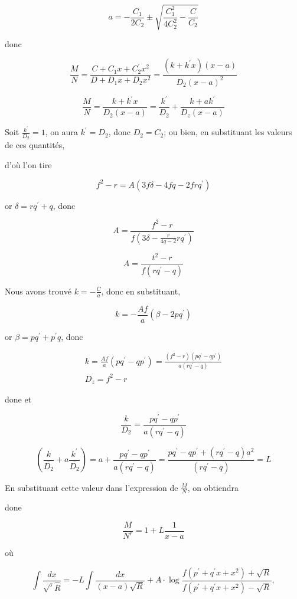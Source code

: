 \documentclass{article}
\begin{document}
\[
a=-\frac{C_{1}}{2 C_{2}} \pm \sqrt{\frac{C_{1}^{2}}{4 C_{2}^{2}}-\frac{C}{C_{2}}}
\]

donc

\[
\frac{M}{N}=\frac{C+C_{1} x+C_{2}^{\prime} x^{2}}{D+D_{1} x+D_{2} x^{2}}=\frac{\left(k+k^{\prime} x\right)(x-a)}{D_{2}(x-a)^{2}}
\]

\[
\frac{M}{N}=\frac{k+k^{\prime} x}{D_{2}(x-a)}=\frac{k^{\prime}}{D_{2}}+\frac{k+a k^{\prime}}{D_{z}(x-a)}
\]

Soit \(\frac{k^{\prime}}{D_{2}}=1\), on aura \(k^{\prime}=D_{2}\), donc \(D_{2}=C_{2}\); ou bien, en substituant les valeurs de ces quantités,

d'où l'on tire

\[
f^{2}-r=A\left(3 f \delta-4 f q-2 f r q^{\prime}\right)
\]

or \(\delta=r q^{\prime}+q\), donc

\[
A=\frac{f^{2}-r}{f\left(3 \delta-\frac{r}{4 q-2} r q^{\prime}\right)}
\]

\[
A=\frac{t^{2}-r}{f\left(r q^{\prime}-q\right)}
\]

Nous avons trouvé \(k=-\frac{C}{a}\), donc en substituant,

\[
k=-\frac{A f}{a}\left(\beta-2 p q^{\prime}\right)
\]

or \(\beta=p q^{\prime}+p^{\prime} q\), donc

\[
\begin{gathered}
k=\frac{A f}{a}\left(p q^{\prime}-q p^{\prime}\right)=\frac{\left(f^{2}-r\right)\left(p q^{\prime}-q p^{\prime}\right)}{a\left(r q^{\prime}-q\right)} \\
D_{z}=f^{2}-r
\end{gathered}
\]

done
et

\[
\frac{k}{D_{2}}=\frac{p q^{\prime}-q p^{\prime}}{a\left(r q^{\prime}-q\right)}
\]

\[
\left(\frac{k}{\overline{D_{2}}}+a \frac{k^{\prime}}{\overline{D_{2}}}\right)=a+\frac{p q^{\prime}-q p^{\prime}}{a\left(r q^{\prime}-q\right)}=\frac{p q^{\prime}-q p^{\prime}+\left(r q^{\prime}-q\right) a^{2}}{\left(r q^{\prime}-q\right)}=L
\]

En substituant cette valeur dans l'expression de \(\frac{M}{N}\), on obtiendra

done

\[
\frac{M}{N^{r}}=1+L \frac{1}{x-a}
\]

où

\[
\int \frac{d x}{\sqrt{\prime} \hat{R}}=-L \int \frac{d x}{(x-a) \sqrt{R}}+A \cdot \log \frac{f\left(p^{\prime}+q^{\prime} x+x^{2}\right)+\sqrt{R}}{f\left(p^{\prime}+q^{\prime} x+x^{2}\right)-\sqrt{R}},
\]
\end{document}
